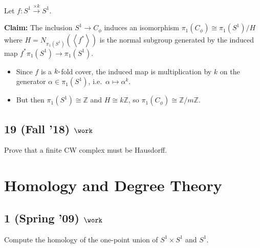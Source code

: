 \begin{solution}

\hfill

\begin{concept}

\hfill

\end{concept}

Let \(f: S^1 \xrightarrow{\times k} S^1\).

\textbf{Claim:} The inclusion \(S^1 \to C_\phi\) induces an isomorphism
\(\pi_1(C_\phi) \cong \pi_1(S^1) / H\) where
\(H = N_{\pi_1(S^1)}(\left\langle{f^*}\right\rangle)\) is the normal
subgroup generated by the induced map \(f^* \pi_1(S^1) \to \pi_1(S^1)\).

\begin{itemize}
\item
  Since \(f\) is a \(k{\hbox{-}}\)fold cover, the induced map is
  multiplication by \(k\) on the generator \(\alpha \in \pi_1(S^1)\),
  i.e.~\(\alpha \mapsto \alpha^k\).
\item
  But then \(\pi_1(S^1) \cong {\mathbb{Z}}\) and
  \(H \cong k{\mathbb{Z}}\), so
  \(\pi_1(C_\phi) \cong {\mathbb{Z}}/m{\mathbb{Z}}\).
\end{itemize}

\end{solution}

\hypertarget{fall-18-work-3}{%
\subsection{\texorpdfstring{19 (Fall '18)
\(\work\)}{19 (Fall '18) \textbackslash work}}\label{fall-18-work-3}}

Prove that a finite CW complex must be Hausdorff.

\hypertarget{homology-and-degree-theory}{%
\section{Homology and Degree Theory}\label{homology-and-degree-theory}}

\hypertarget{spring-09-work-3}{%
\subsection{\texorpdfstring{1 (Spring '09)
\(\work\)}{1 (Spring '09) \textbackslash work}}\label{spring-09-work-3}}

Compute the homology of the one-point union of \(S^1 \times S^1\) and
\(S^1\).

